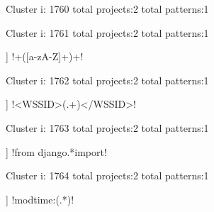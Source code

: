 Cluster i: 1760
total projects:2
total patterns:1
\begin{multicols}{1}
\end{multicols}







Cluster i: 1761
total projects:2
total patterns:1
\begin{multicols}{1}
\begin{description}[noitemsep,topsep=0pt]
\item [[2] ] \cverb!\s+([a-zA-Z]+)\s+!
\end{description}
\end{multicols}







Cluster i: 1762
total projects:2
total patterns:1
\begin{multicols}{1}
\begin{description}[noitemsep,topsep=0pt]
\item [[2] ] \cverb!<WSSID>(.+)</WSSID>!
\end{description}
\end{multicols}







Cluster i: 1763
total projects:2
total patterns:1
\begin{multicols}{1}
\begin{description}[noitemsep,topsep=0pt]
\item [[2] ] \cverb!from django.*import!
\end{description}
\end{multicols}







Cluster i: 1764
total projects:2
total patterns:1
\begin{multicols}{1}
\begin{description}[noitemsep,topsep=0pt]
\item [[2] ] \cverb!\s*modtime:\s*(.*)!
\end{description}
\end{multicols}







